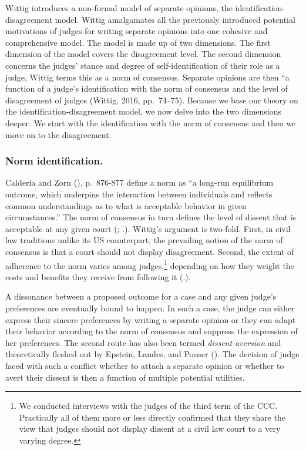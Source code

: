 \documentclass[
  11pt,
]{article}
\begin{document}
Wittig introduces a non-formal model of separate opinions, the identification-disagreement model. Wittig amalgamates all the previously introduced potential motivations of judges for writing separate opinions into one cohesive and comprehensive model. The model is made up of two dimensions. The first dimension of the model covers the disagreement level. The second dimension concerns the judges' stance and degree of self-identification of their role as a judge, Wittig terms this as a norm of consensus. Separate opinions are then ``a function of a judge's identification with the norm of consensus and the level of disagreement of judges (Wittig, 2016, pp.~74--75). Because we base our theory on the identification-disagreement model, we now delve into the two dimensions deeper. We start with the identification with the norm of consensus and then we move on to the disagreement.

\subsubsection{Norm identification.}\label{norm-identification.}

Calderia and Zorn (), p.~876-877 define a norm as ``a long-run equilibrium outcome, which underpins the interaction between individuals and reflects common understandings as to what is acceptable behavior in given circumstances.'' The norm of consensus in turn defines the level of dissent that is acceptable at any given court (; .). Wittig's argument is two-fold. First, in civil law traditions unlike its US counterpart, the prevailing notion of the norm of consensus is that a court should not display disagreement. Second, the extent of adherence to the norm varies among judges,\footnote{We conducted interviews with the judges of the third term of the CCC. Practically all of them more or less directly confirmed that they share the view that judges should not display dissent at a civil law court to a very varying degree.} depending on how they weight the costs and benefits they receive from following it (.).

A dissonance between a proposed outcome for a case and any given judge's preferences are eventually bound to happen. In such a case, the judge can either express their sincere preferences by writing a separate opinion or they can adapt their behavior according to the norm of consensus and suppress the expression of her preferences. The second route has also been termed \emph{dissent aversion} and theoretically fleshed out by Epstein, Landes, and Posner (). The decision of judge faced with such a conflict whether to attach a separate opinion or whether to avert their dissent is then a function of multiple potential utilities.
\end{document}
